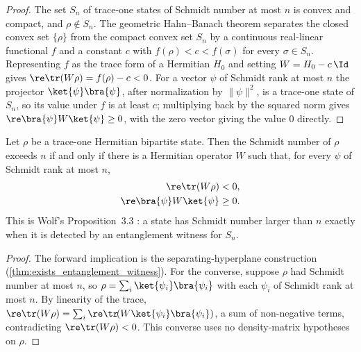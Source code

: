 \begin{proof}
    \leanok
    The set $S_n$ of trace-one states of Schmidt number at most $n$ is convex and
    compact, and $\rho\notin S_n$. The geometric Hahn--Banach theorem separates the
    closed convex set $\{\rho\}$ from the compact convex set $S_n$ by a continuous
    real-linear functional $f$ and a constant $c$ with $f(\rho)<c<f(\sigma)$ for every
    $\sigma\in S_n$. Representing $f$ as the trace form of a Hermitian $H_0$ and setting
    $W=H_0-c\,\Id$ gives $\re\tr(W\rho)=f(\rho)-c<0$. For a vector $\psi$
    of Schmidt rank at most $n$ the projector $\ket{\psi}\bra{\psi}$, after
    normalization by $\lVert\psi\rVert^2$, is a trace-one state of $S_n$, so its value
    under $f$ is at least $c$; multiplying back by the squared norm gives
    $\re\bra{\psi}W\ket{\psi}\ge 0$, with the zero vector giving the value
    $0$ directly.
\end{proof}

\begin{theorem}
    \label{thm:not_has_schmidt_number_le_iff_exists_witness}
    \leanok
    Let $\rho$ be a trace-one Hermitian bipartite state. Then the Schmidt number of
    $\rho$ exceeds $n$ if and only if there is a Hermitian operator $W$ such that, for
    every $\psi$ of Schmidt rank at most $n$,
    \begin{align}
        \re\tr(W\rho)            & <0,
        \notag                            \\
        \re\bra{\psi}W\ket{\psi} & \ge 0.
        \notag
    \end{align}
    This is Wolf's Proposition~3.3 \cite[Chapter~3, Proposition~3.3]{Wolf2012Quantum}: a
    state has Schmidt number larger than $n$ exactly when it is detected by an
    entanglement witness for $S_n$.
\end{theorem}

\begin{proof}
    \leanok
    The forward implication is the separating-hyperplane construction
    (\ref{thm:exists_entanglement_witness}). For the converse, suppose $\rho$ had Schmidt
    number at most $n$, so $\rho=\sum_i\ket{\psi_i}\bra{\psi_i}$ with each $\psi_i$ of
    Schmidt rank at most $n$. By linearity of the trace,
    $\re\tr(W\rho)=\sum_i\re\tr\!(W\ket{\psi_i}\bra{\psi_i})$,
    a sum of non-negative terms, contradicting $\re\tr(W\rho)<0$. This
    converse uses no density-matrix hypotheses on $\rho$.
\end{proof}

